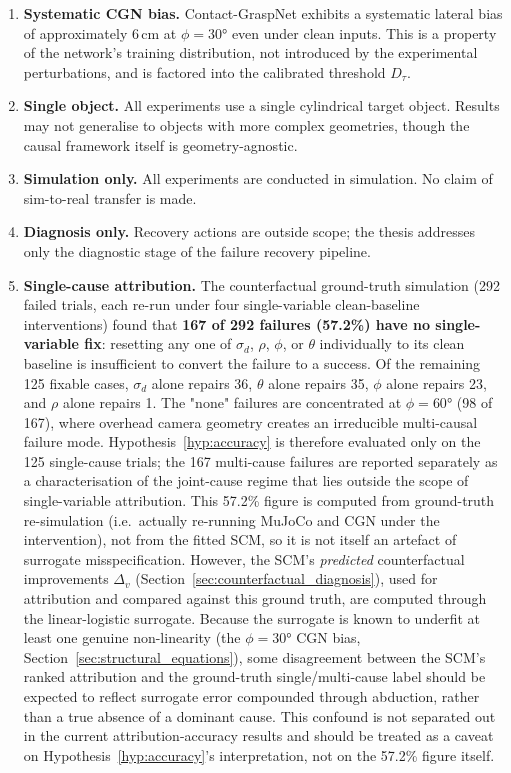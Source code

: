 \documentclass[11pt,a4paper]{report}
\begin{document}
\begin{enumerate}
  \item \textbf{Systematic CGN bias.} Contact-GraspNet exhibits a systematic lateral bias of approximately 6\,cm at $\phi = 30°$ even under clean inputs. This is a property of the network's training distribution, not introduced by the experimental perturbations, and is factored into the calibrated threshold $D_\tau$.

  \item \textbf{Single object.} All experiments use a single cylindrical target object. Results may not generalise to objects with more complex geometries, though the causal framework itself is geometry-agnostic.

  \item \textbf{Simulation only.} All experiments are conducted in simulation. No claim of sim-to-real transfer is made.

  \item \textbf{Diagnosis only.} Recovery actions are outside scope; the thesis addresses only the diagnostic stage of the failure recovery pipeline.

  \item \textbf{Single-cause attribution.} The counterfactual ground-truth simulation (292 failed trials, each re-run under four single-variable clean-baseline interventions) found that \textbf{167 of 292 failures (57.2\%) have no single-variable fix}: resetting any one of $\sigma_d$, $\rho$, $\phi$, or $\theta$ individually to its clean baseline is insufficient to convert the failure to a success. Of the remaining 125 fixable cases, $\sigma_d$ alone repairs 36, $\theta$ alone repairs 35, $\phi$ alone repairs 23, and $\rho$ alone repairs 1. The "none" failures are concentrated at $\phi = 60°$ (98 of 167), where overhead camera geometry creates an irreducible multi-causal failure mode. Hypothesis~\ref{hyp:accuracy} is therefore evaluated only on the 125 single-cause trials; the 167 multi-cause failures are reported separately as a characterisation of the joint-cause regime that lies outside the scope of single-variable attribution. This 57.2\% figure is computed from ground-truth re-simulation (i.e.\ actually re-running MuJoCo and CGN under the intervention), not from the fitted SCM, so it is not itself an artefact of surrogate misspecification. However, the SCM's \emph{predicted} counterfactual improvements $\Delta_v$ (Section~\ref{sec:counterfactual_diagnosis}), used for attribution and compared against this ground truth, are computed through the linear-logistic surrogate. Because the surrogate is known to underfit at least one genuine non-linearity (the $\phi = 30°$ CGN bias, Section~\ref{sec:structural_equations}), some disagreement between the SCM's ranked attribution and the ground-truth single/multi-cause label should be expected to reflect surrogate error compounded through abduction, rather than a true absence of a dominant cause. This confound is not separated out in the current attribution-accuracy results and should be treated as a caveat on Hypothesis~\ref{hyp:accuracy}'s interpretation, not on the 57.2\% figure itself.


\end{enumerate}
\end{document}
